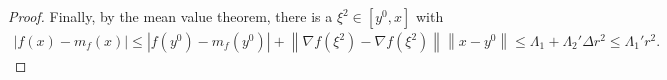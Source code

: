 \documentclass{article}
\theoremstyle{case}
\numberwithin{theorem}{subsection}
\newcommand{\gradf}{\nabla f}
\newcommand{\liphess}{{L_{\nabla^2}}}
\begin{document}
\begin{proof}
Finally, by the mean value theorem, there is a $\xi^2 \in [y^0, x]$ with
\begin{align*}
\left|f(x) - m_f(x)\right|
\le \left| f(y^0) - m_f(y^0) \right| + \left\| \nabla f(\xi^2) - \nabla f(\xi^2) \right\| \left\|x - y^0\right\|
\le \Lambda_1 + \Lambda_2' \Delta r^2
\le \Lambda_1' r^2.
\end{align*}
% 
% 
% 
% 
% 
% 
% 
% 
% 
% 
% 
% 

\end{proof}
\end{document}
